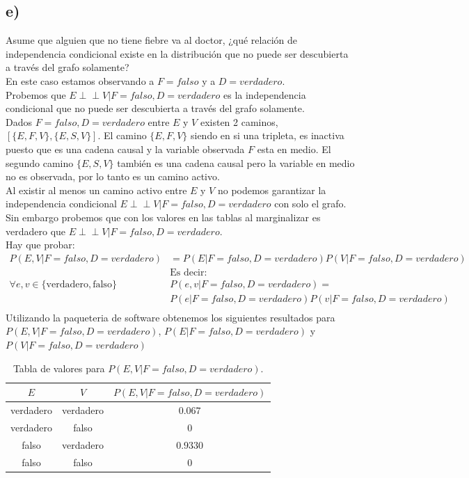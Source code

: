 \documentclass[12pt]{article}
\begin{document}
\subsection{e)} Asume que alguien que no tiene fiebre va al doctor, ¿qué relación de independencia condicional existe en la distribución que no puede ser descubierta a través del grafo solamente?\\
En este caso estamos observando a $F=falso$ y a $D=verdadero$.\\
Probemos que $E  \perp\!\!\!\perp V | F=falso,D=verdadero$ es la independencia condicional que no puede ser descubierta a través del grafo solamente.\\
Dados $ F=falso,D=verdadero$ entre $E$ y $V$ existen 2 caminos, $[\{E,F,V\},\{E,S,V\}]$.
El camino $\{E,F,V\}$ siendo en si una tripleta, es inactiva puesto que es una cadena causal y la variable observada $F$ esta en medio. El segundo camino $\{E,S,V\}$ también es una cadena causal pero la variable en medio no es observada, por lo tanto es un camino activo.\\
Al existir al menos un camino activo entre $E$ y $V$ no podemos garantizar la independencia condicional $E  \perp\!\!\!\perp V | F=falso,D=verdadero$ con solo el grafo.\\
Sin embargo probemos que con los valores en las tablas al marginalizar es verdadero que $E  \perp\!\!\!\perp V | F=falso,D=verdadero$.\\
Hay que probar:\\
\begin{equation}
	\begin{split}
	P(E,V|F=falso,D=verdadero)&=P(E|F=falso,D=verdadero)P(V|F=falso,D=verdadero)\\
	&\text{Es decir:}\\
	\forall{e,v\in \{\text{verdadero}, \text{falso}\}}&P(e,v|F=falso,D=verdadero)=\\
	&P(e|F=falso,D=verdadero)P(v|F=falso,D=verdadero)\\
	\end{split}
\end{equation}
Utilizando la paqueteria de software obtenemos los siguientes resultados para $P(E,V|F=falso,D=verdadero)$, $P(E|F=falso,D=verdadero)$ y $P(V|F=falso,D=verdadero)$\\
\begin{table}[h!]
	\centering
	\begin{tabular}{|c|c|c|}
		\hline
		\rowcolor[gray]{.8}
		$E$&$V$&$P(E,V|F=falso,D=verdadero)$ \\\hline %
		verdadero&verdadero & $0.067$\\\hline
		verdadero&falso & $0$\\\hline
		falso&verdadero & $0.9330$\\\hline
		falso&falso & $0$\\\hline
	\end{tabular}
	\caption{Tabla de valores para $P(E,V|F=falso,D=verdadero)$.}
	\label{tab:ej3e010}
\end{table}
\end{document}
